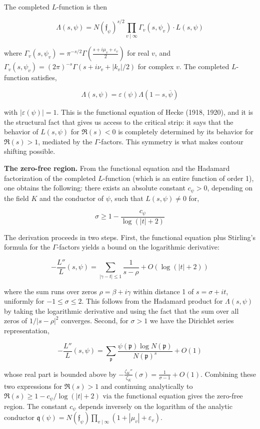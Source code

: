 \documentclass[12pt,a4paper]{article}
\begin{document}
The completed $L$-function is then

\[
\Lambda(s, \psi) = N(\mathfrak{f}_{\psi})^{s/2} \prod_{v \mid \infty} \Gamma_{\!v}(s, \psi_v) \cdot L(s, \psi)
\]

where $\Gamma_{\!v}(s, \psi_v) = \pi^{-s/2} \Gamma\!\left(\frac{s + i\mu_v + \varepsilon_v}{2}\right)$ for real $v$, and $\Gamma_{\!v}(s, \psi_v) = (2\pi)^{-s} \Gamma(s + i\nu_v + |k_v|/2)$ for complex $v$. The completed $L$-function satisfies,

\[
\Lambda(s, \psi) = \varepsilon(\psi) \Lambda(1-s, \overline{\psi})
\]

with $|\varepsilon(\psi)| = 1$. This is the functional equation of Hecke (1918, 1920), and it is the structural fact that gives us access to the critical strip: it says that the behavior of $L(s, \psi)$ for $\Re(s) < 0$ is completely determined by its behavior for $\Re(s) > 1$, mediated by the $\Gamma$-factors. This symmetry is what makes contour shifting possible.

\textbf{The zero-free region.} From the functional equation and the Hadamard factorization of the completed $L$-function (which is an entire function of order 1), one obtains the following: there exists an absolute constant $c_{\psi} > 0$, depending on the field $K$ and the conductor of $\psi$, such that $L(s, \psi) \neq 0$ for,

\[
\sigma \geq 1 - \frac{c_{\psi}}{\log(|t|+2)}
\]

The derivation proceeds in two steps. First, the functional equation plus Stirling's formula for the $\Gamma$-factors yields a bound on the logarithmic derivative:

\[
-\frac{L''}{L}(s, \psi) = \sum_{|\gamma-t| \leq 1} \frac{1}{s-\rho} + O(\log(|t|+2))
\]

where the sum runs over zeros $\rho = \beta + i\gamma$ within distance 1 of $s = \sigma + it$, uniformly for $-1 \leq \sigma \leq 2$. This follows from the Hadamard product for $\Lambda(s, \psi)$ by taking the logarithmic derivative and using the fact that the sum over all zeros of $1/|s-\rho|^2$ converges. Second, for $\sigma > 1$ we have the Dirichlet series representation,

\[
-\frac{L''}{L}(s, \psi) = \sum_{\mathfrak{p}} \frac{\psi(\mathfrak{p}) \log N(\mathfrak{p})}{N(\mathfrak{p})^s} + O(1)
\]

whose real part is bounded above by $-\frac{\zeta_K''}{\zeta_K}(\sigma) = \frac{1}{\sigma-1} + O(1)$. Combining these two expressions for $\Re(s) > 1$ and continuing analytically to $\Re(s) \geq 1 - c_{\psi}/\log(|t|+2)$ via the functional equation gives the zero-free region. The constant $c_{\psi}$ depends inversely on the logarithm of the analytic conductor $\mathfrak{q}(\psi) = N(\mathfrak{f}_{\psi}) \prod_{v \mid \infty} (1 + |\mu_v| + \varepsilon_v)$.
\end{document}
